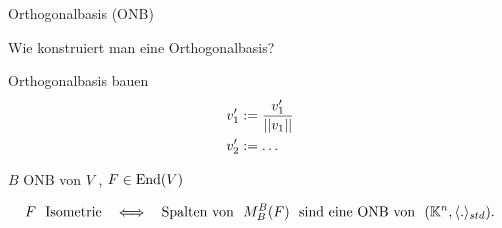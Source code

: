 \documentclass[class=article, crop=false]{standalone}
\begin{document}
\begin{zettel}{Orthogonalbasis (ONB)}
\begin{flashcard}
\begin{question}
Wie konstruiert man eine Orthogonalbasis?
\end{question}
    Orthogonalbasis bauen
    \begin{align*}
        v_1' &:= \frac{v_1'}{ \left|\left|v_1\right|\right|}\\
        v_2' &:= \dots
    \end{align*}

\end{flashcard}
$B$ ONB von $V$ , $F \in  \operatorname{End}(V)$ 
\begin{theorem}
\[
F \tx{ Isometrie } \iff  \tx{ Spalten von } M_B^B (F) \tx{ sind eine ONB von } (\mathbb{K}^n, \langle .\rangle_{std})
.\]
\end{theorem}

\end{zettel}
\end{document}
